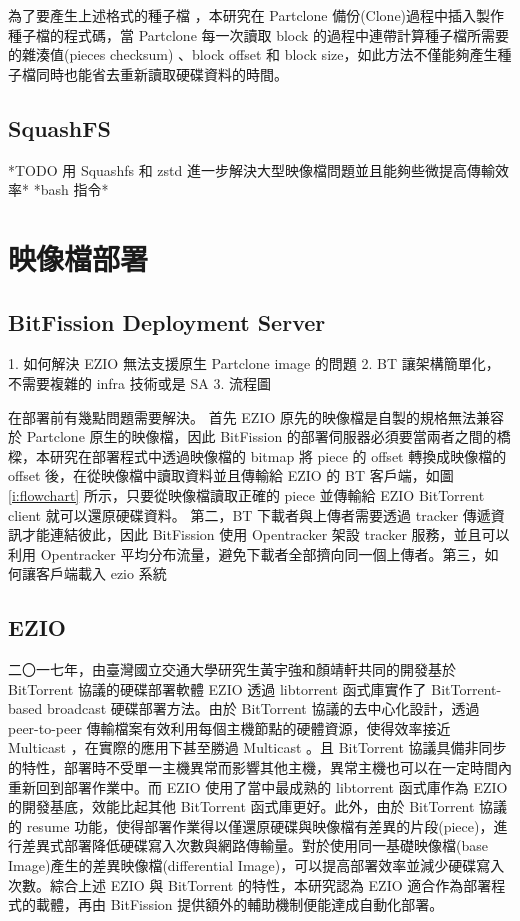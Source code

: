 為了要產生上述格式的種子檔 ，本研究在 Partclone 備份(Clone)過程中插入製作種子檔的程式碼，當 Partclone 每一次讀取 block 的過程中連帶計算種子檔所需要的雜湊值(pieces checksum) 、block offset 和 block size，如此方法不僅能夠產生種子檔同時也能省去重新讀取硬碟資料的時間。


\subsection{SquashFS}
*TODO 用 Squashfs 和 zstd 進一步解決大型映像檔問題並且能夠些微提高傳輸效率*
*bash 指令*


\section{映像檔部署}
\subsection{BitFission Deployment Server}
1. 如何解決 EZIO 無法支援原生 Partclone image 的問題
2. BT 讓架構簡單化，不需要複雜的 infra 技術或是 SA 
3. 流程圖


在部署前有幾點問題需要解決。
首先 EZIO 原先的映像檔是自製的規格無法兼容於 Partclone 原生的映像檔，因此 BitFission 的部署伺服器必須要當兩者之間的橋樑，本研究在部署程式中透過映像檔的 bitmap 將 piece 的 offset 轉換成映像檔的 offset 後，在從映像檔中讀取資料並且傳輸給 EZIO 的 BT 客戶端，如圖 \ref{i:flowchart} 所示，只要從映像檔讀取正確的 piece 並傳輸給 EZIO BitTorrent client 就可以還原硬碟資料。
第二，BT 下載者與上傳者需要透過 tracker 傳遞資訊才能連結彼此，因此 BitFission 使用 Opentracker 架設 tracker 服務，並且可以利用 Opentracker 平均分布流量，避免下載者全部擠向同一個上傳者。第三，如何讓客戶端載入 ezio 系統



\subsection{EZIO}
二〇一七年，由臺灣國立交通大學研究生黃宇強和顏靖軒共同的開發基於 BitTorrent 協議的硬碟部署軟體 EZIO\cite{ezio} 透過 libtorrent 函式庫實作了 BitTorrent-based broadcast 硬碟部署方法。由於 BitTorrent 協議的去中心化設計，透過 peer-to-peer 傳輸檔案有效利用每個主機節點的硬體資源，使得效率接近 Multicast ，在實際的應用下甚至勝過 Multicast 。且 BitTorrent 協議具備非同步的特性，部署時不受單一主機異常而影響其他主機，異常主機也可以在一定時間內重新回到部署作業中。而 EZIO 使用了當中最成熟的 libtorrent 函式庫作為 EZIO 的開發基底，效能比起其他 BitTorrent 函式庫更好。此外，由於 BitTorrent 協議的 resume 功能，使得部署作業得以僅還原硬碟與映像檔有差異的片段(piece)，進行差異式部署降低硬碟寫入次數與網路傳輸量。對於使用同一基礎映像檔(base Image)產生的差異映像檔(differential Image)，可以提高部署效率並減少硬碟寫入次數。綜合上述 EZIO 與 BitTorrent 的特性，本研究認為 EZIO 適合作為部署程式的載體，再由 BitFission 提供額外的輔助機制便能達成自動化部署。

